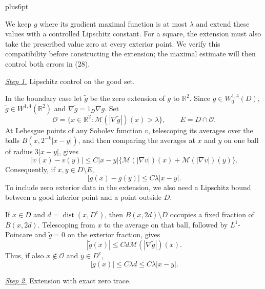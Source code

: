 \documentclass[11pt,reqno]{amsart}
\makeatletter
\theoremstyle{plain}
\theoremstyle{definition}
\theoremstyle{remark}
\renewenvironment{proof}[1][\proofname]{%
  \par
  \pushQED{\qed}%
  \normalfont
  \topsep6pt plus6pt\relax
  \trivlist
  \item[\hskip\labelsep\slshape #1\@addpunct{.}]%
  \ignorespaces
}{%
  \popQED
  \endtrivlist
  \@endpefalse
}
\DeclareRobustCommand{\qed}{%
  \leavevmode\unskip\penalty9999\hbox{}\nobreak
  \ifmmode
    \makebox[0pt][l]{\qquad\hbox{\qedsymbol}}%
  \else
    \qquad\hbox{\qedsymbol}%
  \fi
}
\renewcommand{\qedsymbol}{\rule[.47pt]{4pt}{6pt}}
\numberwithin{equation}{section}
\newcommand{\1}{\mathbf 1}
\makeatother
\begin{document}
\begin{proof}
We keep $g$ where its gradient maximal function is at most $\lambda$
and extend these values with a controlled Lipschitz constant.  For a
square, the extension must also take the prescribed value zero at every
exterior point.  We verify this compatibility before constructing the
extension; the maximal estimate will then control both errors in (28).

\smallskip\noindent
\underline{\textit{Step 1.}} Lipschitz control on the good set.

In the boundary case let $\widetilde g$ be the zero extension of $g$
to $\mathbb R^2$.  Since $g\in W^{1,4}_ 0(D)$,
$\widetilde g\in W^{1,4}(\mathbb R^2)$ and
$\nabla\widetilde g=1_ D\nabla g$.  Set
\begin{equation*}
\mathcal O=\{x\in\mathbb R^2:
\mathcal M(|\nabla\widetilde g|)(x)>\lambda\},\qquad
E=D\cap\mathcal O.
\end{equation*}
At Lebesgue points of any Sobolev function $v$, telescoping its averages
over the balls $B(x,2^{-k}|x-y|)$, and then comparing the averages at
$x$ and $y$ on one ball of radius $3|x-y|$, gives
\begin{equation*}
|v(x)-v(y)|\leq C|x-y|
\{\mathcal M(|\nabla v|)(x)+\mathcal M(|\nabla v|)(y)\}.
\end{equation*}
Consequently, if $x,y\in D\setminus E$,
\begin{equation}
|g(x)-g(y)|\leq C\lambda|x-y|.
\tag{28a}
\end{equation}
To include zero exterior data in the extension, we also need a
Lipschitz bound between a good interior point and a point outside $D$.

If $x\in D$ and $d=\operatorname {dist}(x,D^c)$, then
$B(x,2d)\setminus D$ occupies a fixed fraction of $B(x,2d)$.
Telescoping from $x$ to the average on that ball, followed by
$L^1$-Poincare and $\widetilde g=0$ on the exterior fraction, gives
\begin{equation*}
|\widetilde g(x)|\leq Cd\mathcal M(|\nabla\widetilde g|)(x).
\end{equation*}
Thus, if also $x\notin\mathcal O$ and $y\in D^c$,
\begin{equation}
|g(x)|\leq C\lambda d\leq C\lambda|x-y|.
\tag{28b}
\end{equation}

\smallskip\noindent
\underline{\textit{Step 2.}} Extension with exact zero trace.


\end{proof}
\end{document}
